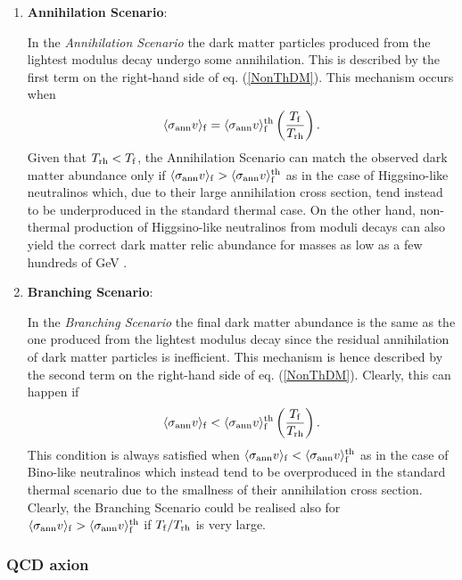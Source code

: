 \begin{enumerate}
\item \textbf{Annihilation Scenario}:

In the \emph{Annihilation Scenario} the dark matter particles produced from the lightest modulus decay undergo some annihilation. This is described by the first term on the right-hand side of eq. (\ref{NonThDM}). This mechanism occurs when
\begin{equation}
\langle\sigma_{\rm ann}v\rangle_{\rm f}=\langle\sigma_{\rm ann}v\rangle^{\rm th}_{\rm f}\left(\frac{T_{\rm f}}{T_{\rm rh}}\right).
\end{equation}
Given that $T_{\rm rh} < T_{\rm f}$, the Annihilation Scenario can match the observed dark matter abundance only if $\langle\sigma_{\rm ann}v\rangle_{\rm f}>\langle\sigma_{\rm ann}v\rangle^{\rm th}_{\rm f}$ as in the case of Higgsino-like neutralinos which, due to their large annihilation cross section, tend instead to be underproduced in the standard thermal case. On the other hand, non-thermal production of Higgsino-like neutralinos from moduli decays can also yield the correct dark matter relic abundance for masses as low as a few hundreds of GeV \cite{Aparicio:2015sda, Aparicio:2016qqb}. 

\item \textbf{Branching Scenario}:

In the \emph{Branching Scenario} the final dark matter abundance is the same as the one produced from the lightest modulus decay since the residual annihilation of dark matter particles is inefficient. This mechanism is hence described by the second term on the right-hand side of eq. (\ref{NonThDM}). Clearly, this can happen if 
\begin{equation}
\langle\sigma_{\rm ann}v\rangle_{\rm f}<\langle\sigma_{\rm ann}v\rangle^{\rm th}_{\rm f}\left(\frac{T_{\rm f}}{T_{\rm rh}}\right).
\end{equation}
This condition is always satisfied when $\langle\sigma_{\rm ann}v\rangle_{\rm f}<\langle\sigma_{\rm ann}v\rangle^{\rm th}_{\rm f}$ as in the case of Bino-like neutralinos which instead tend to be overproduced in the standard thermal scenario due to the smallness of their annihilation cross section. Clearly, the Branching Scenario could be realised also for $\langle\sigma_{\rm ann}v\rangle_{\rm f}>\langle\sigma_{\rm ann}v\rangle^{\rm th}_{\rm f}$
if $T_{\rm f}/T_{\rm rh}$ is very large.
\end{enumerate}

\subsubsection{QCD axion}

